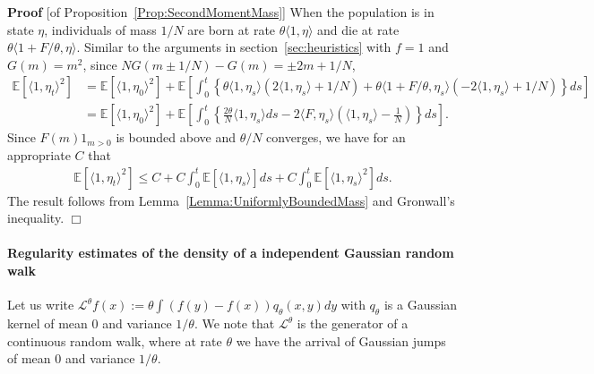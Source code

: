 \documentclass[12pt]{article}
\newenvironment {proof}{{\noindent\bf Proof }}{\hfill $\Box$ \medskip}
\newcommand{\IE}{\mathbb E}
\begin{document}
\begin{proof}[of Proposition~\ref{Prop:SecondMomentMass}]
    When the population is in state $\eta$,
    individuals of mass $1/N$ are born at rate $\theta \langle 1, \eta \rangle$
    and die at rate $\theta \langle 1 + F/\theta, \eta \rangle$.
    Similar to the arguments in section~\ref{sec:heuristics} with $f=1$ and $G(m) = m^2$,
    since $N G(m \pm 1/N) - G(m) = \pm 2m + 1/N$,
    \begin{align*}
        \IE[\langle 1, \eta_t \rangle^2]
        &=
        \IE[\langle 1, \eta_0 \rangle^2]
        +
        \IE\left[
        \int_0^t
        \left\{
            \theta \langle 1, \eta_s \rangle
            \left( 2 \langle 1, \eta_s \rangle + 1/N \right)
            +
            \theta \langle 1 + F/\theta, \eta_s \rangle
            \left( - 2 \langle 1, \eta_s \rangle + 1/N \right)
        \right\}
        ds
        \right]
        \\
        &=
        \IE[\langle 1, \eta_0 \rangle^2]
        +
        \IE\left[
        \int_0^t \left\{
            \frac{2\theta}{N} \langle 1, \eta_s \rangle ds
            -
            2 \langle F, \eta_s \rangle \left(\langle 1, \eta_s \rangle - \frac{1}{N} \right)
        \right\} ds \right].
    \end{align*}
    Since $F(m)1_{m > 0}$ is bounded above and $\theta/N$ converges,
    we have for an appropriate $C$ that
    \begin{align*}
        \IE[\langle 1, \eta_t \rangle^2]
        \le
        C + C \int_0^t \IE[\langle 1, \eta_s \rangle] ds
        + C \int_0^t \IE[\langle 1, \eta_s \rangle^2] ds .
    \end{align*}
    The result follows from Lemma~\ref{Lemma:UniformlyBoundedMass} and Gronwall's inequality.
\end{proof}


\paragraph{Regularity estimates of the density of a independent Gaussian random walk}
Let us write $\mathcal{L}^\theta f(x) := \theta \int (f(y)-f(x))q_\theta(x,y) dy$ with $q_\theta$ is a Gaussian kernel of mean $0$ and variance $1/\theta$. We note that $\mathcal{L}^\theta$ is the generator of a continuous random walk, where at rate $\theta$ we have the arrival of Gaussian jumps of mean $0$ and variance $1/\theta$.
\end{document}
